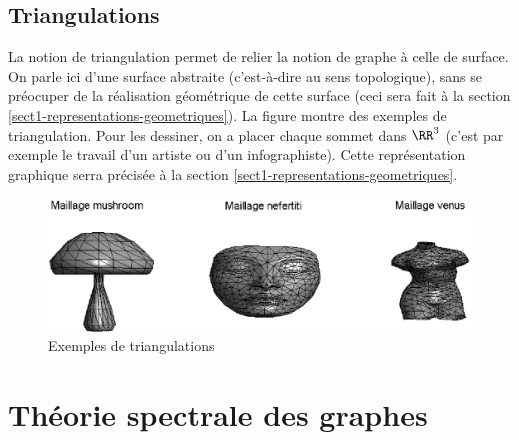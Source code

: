 \subsection{Triangulations}
\label{sect2-triangulations} 


\mathspace{}
\begin{defn}[Triangulation]

\end{defn}\noindent
La notion de triangulation permet de relier la notion de graphe à celle de surface. On parle ici d'une surface abstraite (c'est-à-dire au sens topologique), sans se préocuper de la réalisation géométrique de cette surface (ceci sera fait à la section \ref{sect1-representations-geometriques}). La figure  montre des exemples de triangulation. Pour les dessiner, on a placer chaque sommet dans $\RR^3$ (c'est par exemple le travail d'un artiste ou d'un infographiste). Cette représentation graphique serra précisée à la section \ref{sect1-representations-geometriques}.\begin{figure}[ht] 
    \begin{center}
    \includegraphics[scale=0.7]{images/graph-examples-meshes.eps}
    \end{center}
    \caption{Exemples de triangulations}
	 \label{fig-graph-examples-meshes}
\end{figure}

\section{Théorie spectrale des graphes}
\label{sect1-theorie-spectrale-graphes} 

